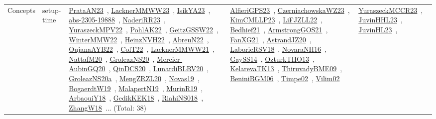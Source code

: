 {\begin{longtable}{lp{3cm}>{\raggedright\arraybackslash}p{6cm}>{\raggedright\arraybackslash}p{6cm}>{\raggedright\arraybackslash}p{8cm}}
Concepts & setup-time & \href{articles/PrataAN23.pdf}{PrataAN23}~\cite{PrataAN23}, \href{articles/LacknerMMWW23.pdf}{LacknerMMWW23}~\cite{LacknerMMWW23}, \href{articles/IsikYA23.pdf}{IsikYA23}~\cite{IsikYA23}, \href{articles/abs-2305-19888.pdf}{abs-2305-19888}~\cite{abs-2305-19888}, \href{articles/NaderiRR23.pdf}{NaderiRR23}~\cite{NaderiRR23}, \href{articles/YuraszeckMPV22.pdf}{YuraszeckMPV22}~\cite{YuraszeckMPV22}, \href{articles/PohlAK22.pdf}{PohlAK22}~\cite{PohlAK22}, \href{papers/GeitzGSSW22.pdf}{GeitzGSSW22}~\cite{GeitzGSSW22}, \href{papers/WinterMMW22.pdf}{WinterMMW22}~\cite{WinterMMW22}, \href{articles/HeinzNVH22.pdf}{HeinzNVH22}~\cite{HeinzNVH22}, \href{articles/AbreuN22.pdf}{AbreuN22}~\cite{AbreuN22}, \href{papers/OujanaAYB22.pdf}{OujanaAYB22}~\cite{OujanaAYB22}, \href{articles/ColT22.pdf}{ColT22}~\cite{ColT22}, \href{papers/LacknerMMWW21.pdf}{LacknerMMWW21}~\cite{LacknerMMWW21}, \href{papers/NattafM20.pdf}{NattafM20}~\cite{NattafM20}, \href{papers/GroleazNS20.pdf}{GroleazNS20}~\cite{GroleazNS20}, \href{papers/Mercier-AubinGQ20.pdf}{Mercier-AubinGQ20}~\cite{Mercier-AubinGQ20}, \href{articles/QinDCS20.pdf}{QinDCS20}~\cite{QinDCS20}, \href{articles/LunardiBLRV20.pdf}{LunardiBLRV20}~\cite{LunardiBLRV20}, \href{papers/GroleazNS20a.pdf}{GroleazNS20a}~\cite{GroleazNS20a}, \href{articles/MengZRZL20.pdf}{MengZRZL20}~\cite{MengZRZL20}, \href{articles/Novas19.pdf}{Novas19}~\cite{Novas19}, \href{papers/BogaerdtW19.pdf}{BogaerdtW19}~\cite{BogaerdtW19}, \href{papers/MalapertN19.pdf}{MalapertN19}~\cite{MalapertN19}, \href{papers/MurinR19.pdf}{MurinR19}~\cite{MurinR19}, \href{papers/ArbaouiY18.pdf}{ArbaouiY18}~\cite{ArbaouiY18}, \href{articles/GedikKEK18.pdf}{GedikKEK18}~\cite{GedikKEK18}, \href{papers/RiahiNS018.pdf}{RiahiNS018}~\cite{RiahiNS018}, \href{articles/ZhangW18.pdf}{ZhangW18}~\cite{ZhangW18}... (Total: 38) & \href{articles/AlfieriGPS23.pdf}{AlfieriGPS23}~\cite{AlfieriGPS23}, \href{articles/CzerniachowskaWZ23.pdf}{CzerniachowskaWZ23}~\cite{CzerniachowskaWZ23}, \href{papers/KimCMLLP23.pdf}{KimCMLLP23}~\cite{KimCMLLP23}, \href{papers/LiFJZLL22.pdf}{LiFJZLL22}~\cite{LiFJZLL22}, \href{articles/Bedhief21.pdf}{Bedhief21}~\cite{Bedhief21}, \href{papers/ArmstrongGOS21.pdf}{ArmstrongGOS21}~\cite{ArmstrongGOS21}, \href{articles/FanXG21.pdf}{FanXG21}~\cite{FanXG21}, \href{articles/AstrandJZ20.pdf}{AstrandJZ20}~\cite{AstrandJZ20}, \href{articles/LaborieRSV18.pdf}{LaborieRSV18}~\cite{LaborieRSV18}, \href{articles/NovaraNH16.pdf}{NovaraNH16}~\cite{NovaraNH16}, \href{papers/GaySS14.pdf}{GaySS14}~\cite{GaySS14}, \href{articles/OzturkTHO13.pdf}{OzturkTHO13}~\cite{OzturkTHO13}, \href{papers/KelarevaTK13.pdf}{KelarevaTK13}~\cite{KelarevaTK13}, \href{papers/ThiruvadyBME09.pdf}{ThiruvadyBME09}~\cite{ThiruvadyBME09}, \href{papers/BeniniBGM06.pdf}{BeniniBGM06}~\cite{BeniniBGM06}, \href{articles/Timpe02.pdf}{Timpe02}~\cite{Timpe02}, \href{papers/Vilim02.pdf}{Vilim02}~\cite{Vilim02} & \href{articles/YuraszeckMCCR23.pdf}{YuraszeckMCCR23}~\cite{YuraszeckMCCR23}, \href{papers/JuvinHHL23.pdf}{JuvinHHL23}~\cite{JuvinHHL23}, \href{papers/JuvinHL23.pdf}{JuvinHL23}~\cite{JuvinHL23}, 
\end{longtable}}

